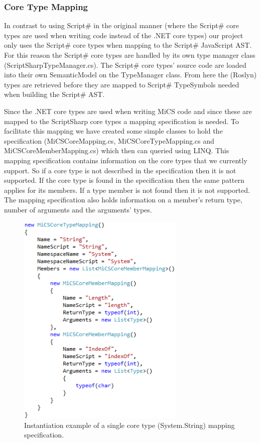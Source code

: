 		\subsubsection{Core Type Mapping} %
		\label{subsub:core:type_mapping}
			In contrast to using Script\# in the original manner (where the Script\# core types are used when writing code instead of the .NET core types) our project only uses the Script\# core types when mapping to the Script\# JavaScript AST. For this reason the Script\# core types are handled by its own type manager class (ScriptSharpTypeManager.cs). The Script\# core types’ source code are loaded into their own SemanticModel on the TypeManager class. From here the (Roslyn) types are retrieved before they are mapped to Script\# TypeSymbols needed when building the Script\# AST.

			Since the .NET core types are used when writing MiCS code and since these are mapped to the ScriptSharp core types a mapping specification is needed. To facilitate this mapping we have created some simple classes to hold the specification (MiCSCoreMapping.cs, MiCSCoreTypeMapping.cs and MiCSCoreMemberMapping.cs) which then can queried using LINQ. This mapping specification contains information on the core types that we currently support. So if a core type is not described in the specification then it is not supported. If the core type is found in the specification then the same pattern applies for its members. If a type member is not found then it is not supported. The mapping specification also holds information on a member’s return type, number of arguments and the arguments’ types.

			\begin{figure}[H]
					\includegraphics[width=8cm]{resources/images/InitiationOfTypeMapping.png}
				\caption{Instantiation example of a single core type (System.String) mapping specification.}
				\label{coreTypeMapping}
			\end{figure}

